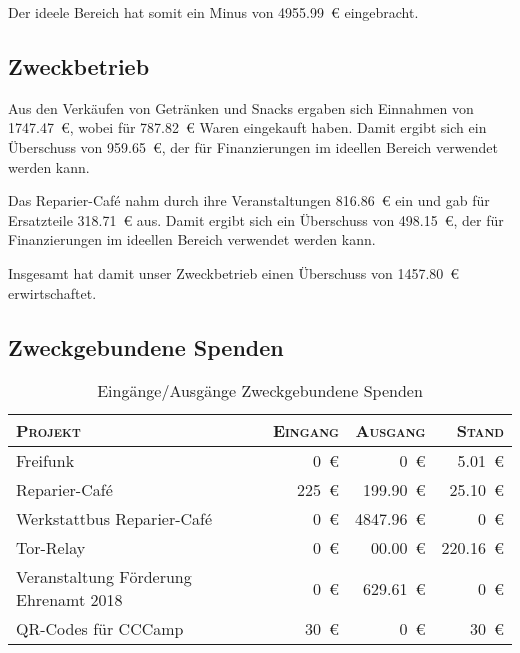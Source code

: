 \documentclass[ngerman]{scrartcl}
\begin{document}
Der ideele Bereich hat somit ein Minus von \num{4955.99}~\euro{} eingebracht.
\newpage
\subsection{Zweckbetrieb}
\label{sec:Zweckbetrieb}
Aus den Verkäufen von Getränken und Snacks ergaben sich Einnahmen von \num{1747,47}~\euro{}, wobei für \num{787,82}~\euro{} Waren eingekauft haben.
Damit ergibt sich ein Überschuss von \num{959,65}~\euro{}, der für Finanzierungen im ideellen Bereich verwendet werden kann.

Das Reparier-Café nahm durch ihre Veranstaltungen \num{816,86}~\euro{} ein und gab für Ersatzteile \num{318,71}~\euro{} aus.
Damit ergibt sich ein Überschuss von \num{498,15}~\euro{}, der für Finanzierungen im ideellen Bereich verwendet werden kann.

Insgesamt hat damit unser Zweckbetrieb einen Überschuss von \num{1457,80}~\euro{} erwirtschaftet.

\subsection{Zweckgebundene Spenden}
\label{sec:zweckgebundene_spenden}

\begin{table}[h]
        \centering
        \begin{tabular}{l|r|r|r}
        \toprule
        \textsc{Projekt} & \textsc{Eingang} & \textsc{Ausgang} & \textsc{Stand} \\
        \midrule
        Freifunk & \num{0}~\euro{} & \num{0}~\euro{} & \num{5,01}~\euro{} \\
        Reparier-Café & \num{225}~\euro{} & \num{199,90}~\euro{} & \num{25,10}~\euro{} \\
        Werkstattbus Reparier-Café & \num{0}~\euro{} & \num{4847,96}~\euro{} & \num{0}~\euro{} \\
        Tor-Relay & \num{0}~\euro{} & \num{00,00}~\euro{} & \num{220,16}~\euro{} \\
        Veranstaltung Förderung Ehrenamt 2018 & \num{0}~\euro{} & \num{629,61}~\euro{} & \num{0}~\euro{} \\
        QR-Codes für CCCamp & \num{30}~\euro{} & \num{0}~\euro{} & \num{30}~\euro{} \\
\bottomrule
        \end{tabular}
        \caption{Eingänge/Ausgänge Zweckgebundene Spenden}
        \label{table:spenden}
\end{table}
\end{document}
